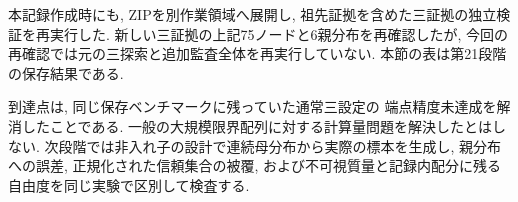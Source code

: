 本記録作成時にも, ZIPを別作業領域へ展開し,
祖先証拠を含めた三証拠の独立検証を再実行した.
新しい三証拠の上記75ノードと6親分布を再確認したが,
今回の再確認では元の三探索と追加監査全体を再実行していない.
本節の表は第21段階の保存結果である.

到達点は, 同じ保存ベンチマークに残っていた通常三設定の
端点精度未達成を解消したことである.
一般の大規模限界配列に対する計算量問題を解決したとはしない.
次段階では非入れ子の設計で連続母分布から実際の標本を生成し,
親分布への誤差, 正規化された信頼集合の被覆,
および不可視質量と記録内配分に残る自由度を同じ実験で区別して検査する.
